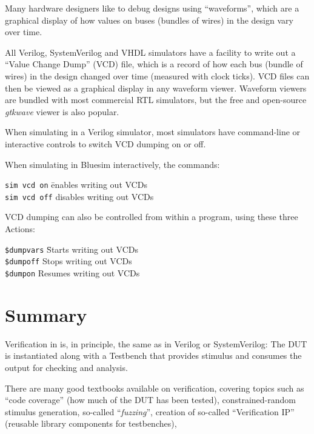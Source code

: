 
Many hardware designers like to debug designs using ``waveforms'',
which are a graphical display of how values on buses (bundles of
wires) in the design vary over time.

All Verilog, SystemVerilog and VHDL simulators have a facility to
write out a ``Value Change Dump'' (VCD) file, which is a record of how
each bus (bundle of wires) in the design changed over time (measured
with clock ticks).  VCD files can then be viewed as a graphical
display in any waveform viewer.  Waveform viewers are bundled with
most commercial RTL simulators, but the free and open-source
\emph{gtkwave} viewer is also popular.

When simulating in a Verilog simulator, most simulators have
command-line or interactive controls to switch VCD dumping on or off.

When simulating in Bluesim interactively, the commands:

\begin{tabbing}
\hmmmm \= {\tt sim vcd on}  \hmm \= enables writing out VCDs \\
       \> {\tt sim vcd off}      \> disables  writing out VCDs
\end{tabbing}

VCD dumping can also be controlled from within a {\BSV} program, using
these three Actions:

\begin{tabbing}
\hmmmm \= {\tt \$dumpvars} \hmm \= Starts writing out VCDs \\
       \> {\tt \$dumpoff}       \> Stops  writing out VCDs \\
       \> {\tt \$dumpon}        \> Resumes writing out VCDs
\end{tabbing}


\section{Summary}

Verification in {\BSV} is, in principle, the same as in Verilog or
SystemVerilog: The DUT is instantiated along with a Testbench that
provides stimulus and consumes the output for checking and analysis.

There are many good textbooks available on verification, covering
topics such as ``code coverage'' (how much of the DUT has been
tested), constrained-random stimulus generation, so-called
``\emph{fuzzing}'', creation of so-called ``Verification IP''
(reusable library components for testbenches), {\etc}

